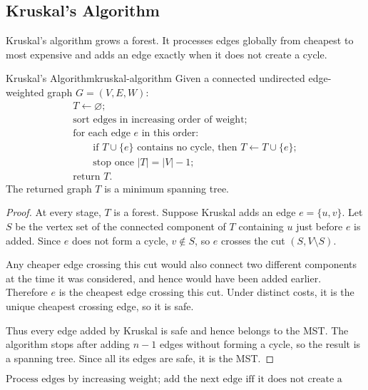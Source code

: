 \subsection{Kruskal's Algorithm}

Kruskal's algorithm grows a forest. It processes edges globally from cheapest to most expensive and adds an edge exactly when it does not create a cycle.

\begin{theorem}{Kruskal's Algorithm}{kruskal-algorithm}
Given a connected undirected edge-weighted graph \(G=(V,E,W)\):
\[
\begin{array}{l}
T\leftarrow \varnothing;\\
\text{sort edges in increasing order of weight;}\\
\text{for each edge }e\text{ in this order:}\\
\qquad \text{if }T\cup\{e\}\text{ contains no cycle, then }T\leftarrow T\cup\{e\};\\
\qquad \text{stop once }|T|=|V|-1;\\
\text{return }T.
\end{array}
\]
The returned graph \(T\) is a minimum spanning tree.
\end{theorem}

\begin{proof}
At every stage, \(T\) is a forest. Suppose Kruskal adds an edge \(e=\{u,v\}\). Let \(S\) be the vertex set of the connected component of \(T\) containing \(u\) just before \(e\) is added. Since \(e\) does not form a cycle, \(v\notin S\), so \(e\) crosses the cut \((S,V\setminus S)\).

Any cheaper edge crossing this cut would also connect two different components at the time it was considered, and hence would have been added earlier. Therefore \(e\) is the cheapest edge crossing this cut. Under distinct costs, it is the unique cheapest crossing edge, so it is safe.

Thus every edge added by Kruskal is safe and hence belongs to the MST. The algorithm stops after adding \(n-1\) edges without forming a cycle, so the result is a spanning tree. Since all its edges are safe, it is the MST.
\end{proof}

\begin{keyformula}[title={Kruskal's rule}]
\[
\text{Process edges by increasing weight; add the next edge iff it does not create a cycle.}
\]
\end{keyformula}

